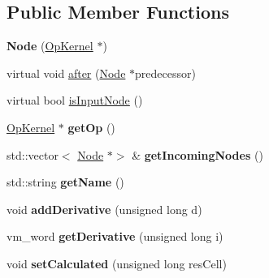 \subsection*{Public Member Functions}
\begin{DoxyCompactItemize}
\item 
\mbox{\label{classathena_1_1core_1_1_node_a7c8ca7c16db4d9d55b2ea3f4336e73ec}} 
{\bfseries Node} (\mbox{\hyperlink{classathena_1_1core_1_1_op_kernel}{Op\+Kernel}} $\ast$)
\item 
virtual void \mbox{\hyperlink{classathena_1_1core_1_1_node_aefef588463c8e215e998415a7cc6b320}{after}} (\mbox{\hyperlink{classathena_1_1core_1_1_node}{Node}} $\ast$predecessor)
\item 
virtual bool \mbox{\hyperlink{classathena_1_1core_1_1_node_a6ae012557fc6b29127366b1e92801d4a}{is\+Input\+Node}} ()
\item 
\mbox{\label{classathena_1_1core_1_1_node_a185a846d26ff9e8bbe21c03ce32aca47}} 
\mbox{\hyperlink{classathena_1_1core_1_1_op_kernel}{Op\+Kernel}} $\ast$ {\bfseries get\+Op} ()
\item 
\mbox{\label{classathena_1_1core_1_1_node_ae4e0e34ffc5d79c5a18d33847cc80331}} 
std\+::vector$<$ \mbox{\hyperlink{classathena_1_1core_1_1_node}{Node}} $\ast$$>$ \& {\bfseries get\+Incoming\+Nodes} ()
\item 
\mbox{\label{classathena_1_1core_1_1_node_a28043abbb7dc60c6a510839928fa2408}} 
std\+::string {\bfseries get\+Name} ()
\item 
\mbox{\label{classathena_1_1core_1_1_node_a290e21f4231f4193c2877b8b85c1864a}} 
void {\bfseries add\+Derivative} (unsigned long d)
\item 
\mbox{\label{classathena_1_1core_1_1_node_a21a8fca47b39e7b21631b5cbc02dbeda}} 
vm\+\_\+word {\bfseries get\+Derivative} (unsigned long i)
\item 
\mbox{\label{classathena_1_1core_1_1_node_af0d6ae48f88c47a04c592c71c4b119e7}} 
void {\bfseries set\+Calculated} (unsigned long res\+Cell)
\item 
$$
\end{DoxyCompactItemize}
